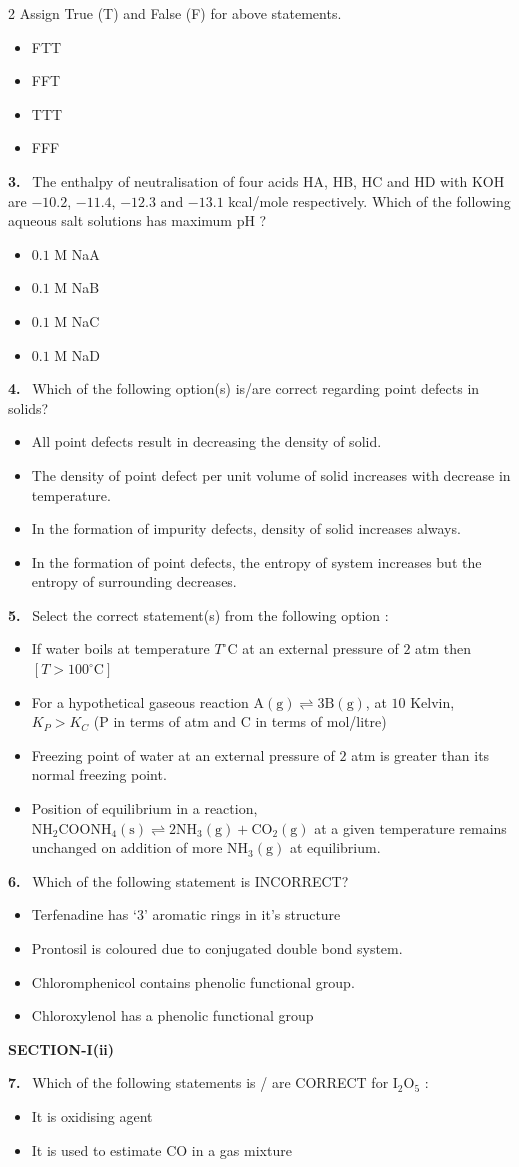 \documentclass[10pt]{extarticle}
\newcommand{\sect}[1]{\par\smallskip\noindent\textbf{#1}\par}
\newcommand{\qn}[1]{\par\smallskip\noindent\textbf{#1.}~}
\newenvironment{qoptions}{\begin{itemize}[leftmargin=1.8em,itemsep=1pt,topsep=2pt,label={}]}{\end{itemize}}
\newcommand{\opt}[2]{\item[(#1)] #2}
\begin{document}
\begin{multicols}{2}
Assign True (T) and False (F) for above statements.
\begin{qoptions}
\opt{A}{FTT}
\opt{B}{FFT}
\opt{C}{TTT}
\opt{D}{FFF}
\end{qoptions}
\qn{3} The enthalpy of neutralisation of four acids HA, HB, HC and HD with KOH are $-10.2$, $-11.4$, $-12.3$ and $-13.1$ kcal/mole respectively. Which of the following aqueous salt solutions has maximum pH ?
\begin{qoptions}
\opt{A}{$0.1$ M NaA}
\opt{B}{$0.1$ M NaB}
\opt{C}{$0.1$ M NaC}
\opt{D}{$0.1$ M NaD}
\end{qoptions}
\qn{4} Which of the following option(s) is/are correct regarding point defects in solids?
\begin{qoptions}
\opt{A}{All point defects result in decreasing the density of solid.}
\opt{B}{The density of point defect per unit volume of solid increases with decrease in temperature.}
\opt{C}{In the formation of impurity defects, density of solid increases always.}
\opt{D}{In the formation of point defects, the entropy of system increases but the entropy of surrounding decreases.}
\end{qoptions}
\qn{5} Select the correct statement(s) from the following option :
\begin{qoptions}
\opt{A}{If water boils at temperature $T^\circ$C at an external pressure of $2$ atm then $[T>100^\circ\mathrm{C}]$}
\opt{B}{For a hypothetical gaseous reaction $\mathrm{A(g)}\rightleftharpoons3\mathrm{B(g)}$, at $10$ Kelvin, $K_P>K_C$ (P in terms of atm and C in terms of mol/litre)}
\opt{C}{Freezing point of water at an external pressure of $2$ atm is greater than its normal freezing point.}
\opt{D}{Position of equilibrium in a reaction, $\mathrm{NH_2COONH_4(s)}\rightleftharpoons2\mathrm{NH_3(g)}+\mathrm{CO_2(g)}$ at a given temperature remains unchanged on addition of more $\mathrm{NH_3(g)}$ at equilibrium.}
\end{qoptions}
\qn{6} Which of the following statement is INCORRECT?
\begin{qoptions}
\opt{A}{Terfenadine has `$3$' aromatic rings in it's structure}
\opt{B}{Prontosil is coloured due to conjugated double bond system.}
\opt{C}{Chloromphenicol contains phenolic functional group.}
\opt{D}{Chloroxylenol has a phenolic functional group}
\end{qoptions}
\sect{SECTION-I(ii)}
\qn{7} Which of the following statements is / are CORRECT for $\mathrm{I_2O_5}$ :
\begin{qoptions}
\opt{A}{It is oxidising agent}
\opt{B}{It is used to estimate CO in a gas mixture}

\end{qoptions}
\end{multicols}
\end{document}
